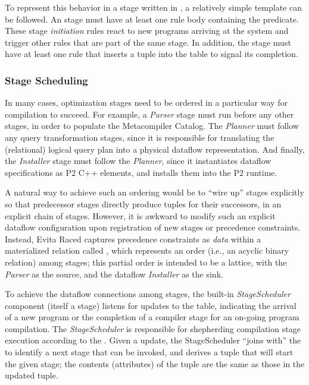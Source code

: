 To represent this behavior in a stage written in \OVERLOG, a relatively simple
template can be followed.  An \OVERLOG stage must have at least one rule body
containing the  predicate.  These stage {\em
initiation} rules react to new programs arriving at the system and trigger
other rules that are part of the same stage.  In addition, the stage must have
at least one rule that inserts a  tuple into the  table
to signal its completion. 

\subsubsection{Stage Scheduling}
\label{ch:evita:sec:stageschedule}

In many cases, optimization stages need to be ordered in a particular way for
compilation to succeed.  For example, a {\em Parser} stage must run before any
other stages, in order to populate the Metacompiler Catalog.  The {\em Planner}
must follow any query transformation stages, since it is responsible for
translating the (relational) logical query plan into a physical dataflow
representation.  And finally, the {\em Installer} stage must follow the {\em
Planner}, since it instantiates dataflow specifications as P2 C++ elements, and
installs them into the P2 runtime.  

A natural way to achieve such an ordering would be to ``wire up'' stages
explicitly so that predecessor stages directly produce
 tuples for their successors, in an explicit chain of
stages.  However, it is awkward to modify such an explicit dataflow
configuration upon registration of new stages or precedence constraints.
Instead, Evita Raced captures precedence constraints as {\em data} within a
materialized relation called , which represents an
order (i.e., an acyclic binary relation) among stages; this partial
order is intended to be a lattice, with the {\em Parser} as the source, and the
dataflow {\em Installer} as the sink.  
 
To achieve the dataflow connections among stages, the built-in {\em
StageScheduler} component (itself a stage) listens for updates to the
 table, indicating the arrival of a new \OVERLOG program or the
completion of a compiler stage for an on-going program compilation.  The {\em
StageScheduler} is responsible for shepherding compilation stage execution
according to the .  Given a  update, the
StageScheduler ``joins with'' the  to identify a next stage
that can be invoked, and derives a  tuple that will
start the given stage; the contents (attributes) of the
 tuple are the same as those in the updated
 tuple.

